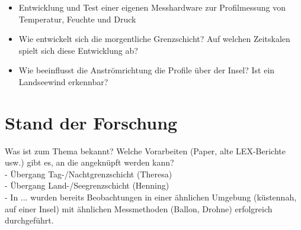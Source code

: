 \documentclass[a4paper,11pt,DIV=calc,tablecaptionabove,headinclude,twoside]{article}
\begin{document}
\begin{itemize}
\item Entwicklung und Test einer eigenen Messhardware zur Profilmessung von
    Temperatur, Feuchte und Druck
\item Wie entwickelt sich die morgentliche Grenzschicht? Auf welchen Zeitskalen spielt sich diese Entwicklung ab?
\item Wie beeinflusst die Anströmrichtung die Profile über der Insel? Ist ein
    Landseewind erkennbar?
\end{itemize}

\section{Stand der Forschung}
Was ist zum Thema bekannt? Welche Vorarbeiten (Paper, alte LEX-Berichte usw.) gibt es, an die angeknüpft werden kann?\\
- Übergang Tag-/Nachtgrenzschicht (Theresa)\\ %
- Übergang Land-/Seegrenzschicht (Henning)\\ %
- In ... wurden bereits Beobachtungen in einer ähnlichen Umgebung (küstennah, auf einer Insel) mit ähnlichen Messmethoden (Ballon, Drohne) erfolgreich durchgeführt.  
\end{document}
